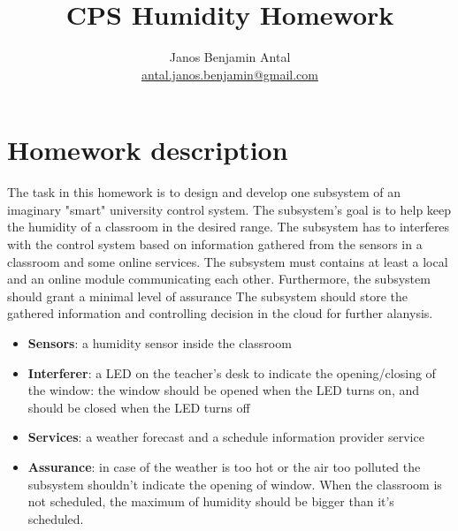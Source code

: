 \documentclass{article}
\author{Janos Benjamin Antal\\\href{mailto:antal.janos.benjamin@gmail.com}{antal.janos.benjamin@gmail.com}}
\title{CPS Humidity Homework}
\begin{document}
\maketitle
\section{Homework description}
The task in this homework is to design and develop one subsystem of an imaginary "smart" university control system. The subsystem's goal is to help keep the humidity of a classroom in the desired range. The subsystem has to interferes with the control system based on information gathered from the sensors in a classroom and some online services. The subsystem must contains at least a local and an online module communicating each other. Furthermore, the subsystem should grant a minimal level of assurance The subsystem should store the gathered information and controlling decision in the cloud for further alanysis.
\begin{itemize}
\item \textbf{Sensors}: a humidity sensor inside the classroom
\item \textbf{Interferer}: a LED on the teacher's desk to indicate the opening/closing of the window: the window should be opened when the LED turns on, and should be closed when the LED turns off
\item \textbf{Services}: a weather forecast and a schedule information provider service
\item \textbf{Assurance}: in case of the weather is too hot or the air too polluted the subsystem shouldn't indicate the opening of window. When the classroom is not scheduled, the maximum of humidity should be bigger than it's scheduled.
\end{itemize}
\end{document}

